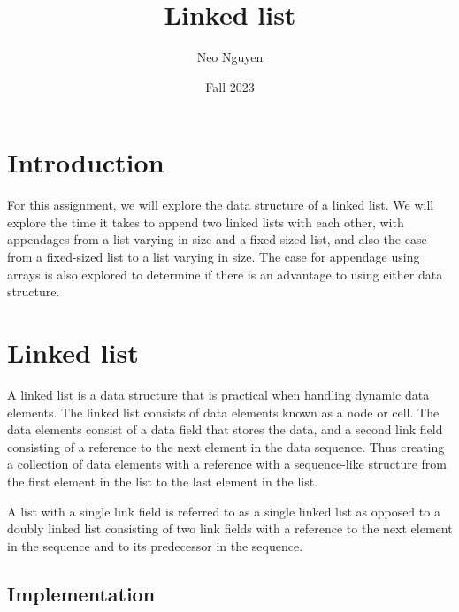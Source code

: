 \documentclass[a4paper,11pt]{article}
\begin{document}
\title{
    \textbf{Linked list}
}
\author{Neo Nguyen}
\date{Fall 2023}

\maketitle

\section*{Introduction}

    For this assignment, we will explore the data structure of a linked list. We will explore the time it takes to append two linked lists with each other, with appendages from a list varying in size and a fixed-sized list, and also the case from a fixed-sized list to a list varying in size. The case for appendage using arrays is also explored to determine if there is an advantage to using either data structure.  
    
\section*{Linked list}

    A linked list is a data structure that is practical when handling dynamic data elements. The linked list consists of data elements known as a node or cell. The data elements consist of a data field that stores the data, and a second link field consisting of a reference to the next element in the data sequence. Thus creating a collection of data elements with a reference with a sequence-like structure from the first element in the list to the last element in the list. 
    
    A list with a single link field is referred to as a single linked list as opposed to a doubly linked list consisting of two link fields with a reference to the next element in the sequence and to its predecessor in the sequence.   

    \subsection*{Implementation}
\end{document}
